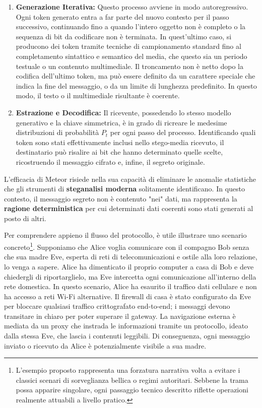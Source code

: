 \begin{enumerate}
	\item \textbf{Generazione Iterativa:} Questo processo avviene in modo autoregressivo. Ogni token generato entra a far parte del nuovo contesto per il passo successivo, continuando fino a quando l'intero oggetto non è completo o la sequenza di bit da codificare non è terminata. In quest'ultimo caso, si producono dei token tramite tecniche di campionamento standard fino al completamento sintattico e semantico del media, che questo sia un periodo testuale o un contenuto multimediale. Il troncamento non è netto dopo la codifica dell'ultimo token, ma può essere definito da un carattere speciale che indica la fine del messaggio, o da un limite di lunghezza predefinito. In questo modo, il testo o il multimediale risultante è coerente.

	\item \textbf{Estrazione e Decodifica:} Il ricevente, possedendo lo stesso modello generativo e la chiave simmetrica, è in grado di ricreare le medesime distribuzioni di probabilità $P_t$ per ogni passo del processo. Identificando quali token sono stati effettivamente inclusi nello stego-media ricevuto, il destinatario può risalire ai bit che hanno determinato quelle scelte, ricostruendo il messaggio cifrato e, infine, il segreto originale.
\end{enumerate}

L'efficacia di Meteor risiede nella sua capacità di eliminare le anomalie statistiche che gli strumenti di \textbf{steganalisi moderna} solitamente identificano. In questo contesto, il messaggio segreto non è contenuto "nei" dati, ma rappresenta la \textbf{ragione deterministica} per cui determinati dati coerenti sono stati generati al posto di altri.

Per comprendere appieno il flusso del protocollo, è utile illustrare uno scenario concreto\footnote{L'esempio proposto rappresenta una forzatura narrativa volta a evitare i classici scenari di sorveglianza bellica o regimi autoritari. Sebbene la trama possa apparire singolare, ogni passaggio tecnico descritto riflette operazioni realmente attuabili a livello pratico.}. Supponiamo che Alice voglia comunicare con il compagno Bob senza che sua madre Eve, esperta di reti di telecomunicazioni e ostile alla loro relazione, lo venga a sapere. Alice ha dimenticato il proprio computer a casa di Bob e deve chiedergli di riportarglielo, ma Eve intercetta ogni comunicazione all'interno della rete domestica. In questo scenario, Alice ha esaurito il traffico dati cellulare e non ha accesso a reti Wi-Fi alternative. Il firewall di casa è stato configurato da Eve per bloccare qualsiasi traffico crittografato end-to-end; i messaggi devono transitare in chiaro per poter superare il gateway. La navigazione esterna è mediata da un proxy che instrada le informazioni tramite un protocollo, ideato dalla stessa Eve, che lascia i contenuti leggibili. Di conseguenza, ogni messaggio inviato o ricevuto da Alice è potenzialmente visibile a sua madre.

